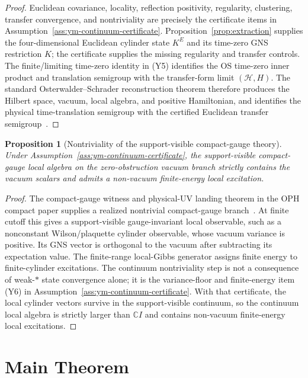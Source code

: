 \documentclass[11pt]{article}
\numberwithin{equation}{section}
\newtheorem{proposition}[theorem]{Proposition}
\theoremstyle{remark}
\newcommand{\Hcal}{\mathcal H}
\newcommand{\C}{\mathbb C}
\begin{document}
\begin{proof}
Euclidean covariance, locality, reflection positivity, regularity, clustering, transfer
convergence, and nontriviality are precisely the certificate items in
Assumption~\ref{ass:ym-continuum-certificate}. Proposition~\ref{prop:extraction} supplies the
four-dimensional Euclidean cylinder state \(K^E\) and its time-zero GNS restriction \(K\); the
certificate supplies the missing regularity and transfer controls. The finite/limiting time-zero
identity in (Y5) identifies the OS time-zero inner product and translation semigroup with the
transfer-form limit \((\Hcal,H)\). The standard Osterwalder--Schrader reconstruction theorem
therefore produces the Hilbert space, vacuum, local algebra, and positive Hamiltonian, and
identifies the physical time-translation semigroup with the certified Euclidean transfer
semigroup~\cite{osterwalder-schrader1,osterwalder-schrader2}.
\end{proof}

\begin{proposition}[Nontriviality of the support-visible compact-gauge theory]
\label{prop:nontriviality}
Under Assumption~\ref{ass:ym-continuum-certificate},
the support-visible compact-gauge local algebra on the zero-obstruction vacuum branch strictly
contains the vacuum scalars and admits a non-vacuum finite-energy local excitation.
\end{proposition}

\begin{proof}
The compact-gauge witness and physical-UV landing theorem in the OPH compact paper supplies a
realized nontrivial compact-gauge branch~\cite{oph2}. At finite cutoff this gives a
support-visible gauge-invariant local observable, such as a nonconstant Wilson/plaquette cylinder
observable, whose vacuum variance is positive. Its GNS vector is orthogonal to the vacuum after
subtracting its expectation value. The finite-range local-Gibbs generator assigns finite energy to
finite-cylinder excitations. The continuum nontriviality step is not a consequence of weak-\(*\)
state convergence alone; it is the variance-floor and finite-energy item (Y6) in
Assumption~\ref{ass:ym-continuum-certificate}. With that certificate, the local cylinder vectors
survive in the support-visible continuum, so the continuum local algebra is strictly larger than
\(\C I\) and contains non-vacuum finite-energy local excitations.
\end{proof}

\section{Main Theorem}
\end{document}

